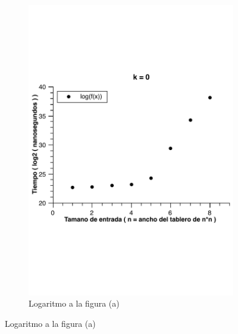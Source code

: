 \begin{figure}[H]
        \begin{subfigure}[b]{0.5\textwidth}
                \includegraphics[width=\textwidth]{imagenes/grafico3-k-0-log.pdf}
                \caption{Logaritmo a la figura (a)}
        \end{subfigure}
        

\end{figure}
